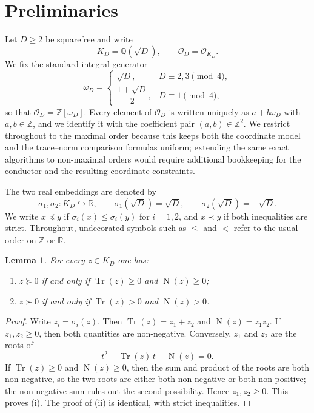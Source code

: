 \documentclass[manuscript]{acmart}
\theoremstyle{plain}
\newtheorem{lemma}[theorem]{Lemma}
\theoremstyle{definition}
\theoremstyle{nonitalicremark}
\newcommand{\Q}{\mathbb{Q}}
\newcommand{\R}{\mathbb{R}}
\newcommand{\Z}{\mathbb{Z}}
\newcommand{\OO}{\mathcal{O}}
\newcommand{\OD}{\OO_D}
\newcommand{\Tr}{\operatorname{Tr}}
\newcommand{\N}{\operatorname{N}}
\newcommand{\into}{\hookrightarrow}
\begin{document}
\section{Preliminaries}\label{sec:prelim}

Let $D\ge 2$ be squarefree and write
\[
K_D=\Q(\sqrt D),
\qquad
\OD=\OO_{K_D}.
\]
We fix the standard integral generator
\[
\omega_D=
\begin{cases}
\sqrt D, & D\equiv 2,3 \pmod 4,\\[0.3em]
\dfrac{1+\sqrt D}{2}, & D\equiv 1 \pmod 4,
\end{cases}
\]
so that $\OD=\Z[\omega_D]$. Every element of $\OD$ is written uniquely as $a+b\omega_D$ with
$a,b\in\Z$, and we identify it with the coefficient pair $(a,b)\in\Z^2$. We restrict throughout to
the maximal order because this keeps both the coordinate model and the trace--norm comparison
formulas uniform; extending the same exact algorithms to non-maximal orders would require additional
bookkeeping for the conductor and the resulting coordinate constraints.

The two real embeddings are denoted by
\[
\sigma_1,\sigma_2:K_D\into\R,
\qquad
\sigma_1(\sqrt D)=\sqrt D,
\qquad
\sigma_2(\sqrt D)=-\sqrt D.
\]
We write $x\preccurlyeq y$ if $\sigma_i(x)\le \sigma_i(y)$ for $i=1,2$, and $x\prec y$ if both
inequalities are strict. Throughout, undecorated symbols such as $\leq$ and $<$ refer to the usual
order on $\Z$ or $\R$.

\begin{lemma}\label{lem:trace-norm}
For every $z\in K_D$ one has:
\begin{enumerate}[label=\textup{(\roman*)}]
\item $z\succcurlyeq 0$ if and only if $\Tr(z)\ge 0$ and $\N(z)\ge 0$;
\item $z\succ 0$ if and only if $\Tr(z)>0$ and $\N(z)>0$.
\end{enumerate}
\end{lemma}

\begin{proof}
Write $z_i=\sigma_i(z)$. Then $\Tr(z)=z_1+z_2$ and $\N(z)=z_1z_2$. If $z_1,z_2\ge 0$, then both
quantities are non-negative. Conversely, $z_1$ and $z_2$ are the roots of
\[
t^2-\Tr(z)\,t+\N(z)=0.
\]
If $\Tr(z)\ge 0$ and $\N(z)\ge 0$, then the sum and product of the roots are both non-negative, so
the two roots are either both non-negative or both non-positive; the non-negative sum rules out the
second possibility. Hence $z_1,z_2\ge 0$. This proves \textup{(i)}. The proof of \textup{(ii)} is
identical, with strict inequalities.
\end{proof}
\end{document}
